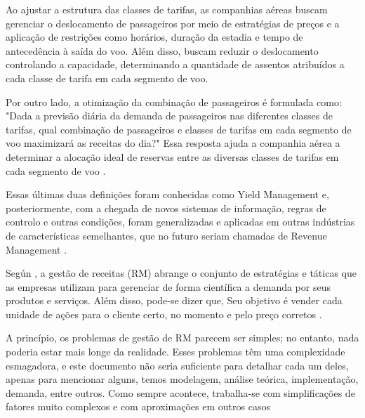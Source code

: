 Ao ajustar a estrutura das classes de tarifas, as companhias aéreas buscam gerenciar o deslocamento de passageiros por meio de estratégias de preços e a aplicação de restrições como horários, duração da estadia e tempo de antecedência à saída do voo. Além disso, buscam reduzir o deslocamento controlando a capacidade, determinando a quantidade de assentos atribuídos a cada classe de tarifa em cada segmento de voo.

Por outro lado, a otimização da combinação de passageiros é formulada como: "Dada a previsão diária da demanda de passageiros nas diferentes classes de tarifas, qual combinação de passageiros e classes de tarifas em cada segmento de voo maximizará as receitas do dia?" Essa resposta ajuda a companhia aérea a determinar a alocação ideal de reservas entre as diversas classes de tarifas em cada segmento de voo \cite{article_base}. 

Essas últimas duas definições foram conhecidas como Yield Management e, posteriormente, com a chegada de novos sistemas de informação, regras de controlo e outras condições, foram generalizadas e aplicadas em outras indústrias de características semelhantes, que no futuro seriam chamadas de Revenue Management \cite{article_YM_to_RM}.

Según \cite{article_Ryzin2014}, a gestão de receitas (RM) abrange o conjunto de estratégias e táticas que as empresas utilizam para gerenciar de forma científica a demanda por seus produtos e serviços. Além disso, pode-se dizer que, Seu objetivo é vender cada unidade de ações para o cliente certo, no momento e pelo preço corretos \cite{doi:10.1080/02642069.2010.491543}.

A princípio, os problemas de gestão de RM parecem ser simples; no entanto, nada poderia estar mais longe da realidade. Esses problemas têm uma complexidade esmagadora, e este documento não seria suficiente para detalhar cada um deles, apenas para mencionar alguns, temos modelagem, análise teórica, implementação, demanda, entre outros. Como sempre acontece, trabalha-se com simplificações de fatores muito complexos e com aproximações em outros casos \cite{doi:10.1287/trsc.33.2.233}
